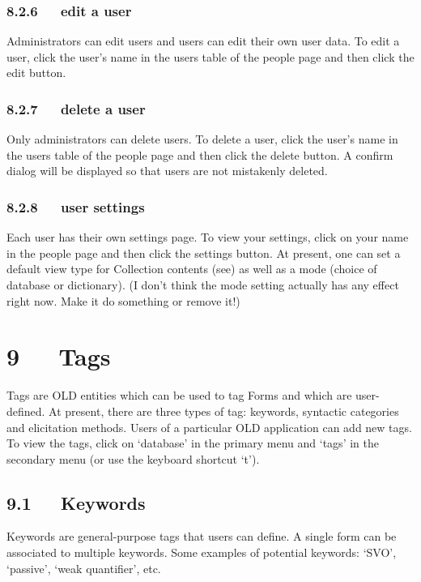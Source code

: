 \documentclass[letterpaper,10pt,english]{sphinxmanual}
\begin{document}
\subsection{8.2.6   edit a user}
\label{documentation:edit-a-user}
Administrators can edit users and users can edit their own user data.  To edit
a user, click the user's name in the users table of the people page and then
click the edit button.


\subsection{8.2.7   delete a user}
\label{documentation:delete-a-user}
Only administrators can delete users.  To delete a user, click the user's name
in the users table of the people page and then click the delete button.  A
confirm dialog will be displayed so that users are not mistakenly deleted.


\subsection{8.2.8   user settings}
\label{documentation:user-settings}
Each user has their own settings page.  To view your settings, click on your
name in the people page and then click the settings button.  At present, one
can set a default view type for Collection contents (see) as well as a mode
(choice of database or dictionary).  (I don't think the mode setting actually
has any effect right now.  Make it do something or remove it!)


\chapter{9   Tags}
\label{documentation:tags}
Tags are OLD entities which can be used to tag Forms and which are user-defined.
At present, there are three types of tag: keywords, syntactic categories and
elicitation methods.  Users of a particular OLD application can add new tags.
To view the tags, click on `database' in the primary menu and `tags' in the
secondary menu (or use the keyboard shortcut `t').


\section{9.1   Keywords}
\label{documentation:id20}
Keywords are general-purpose tags that users can define.  A single form can be
associated to multiple keywords.  Some examples of potential keywords: `SVO',
`passive', `weak quantifier', etc.
\end{document}
